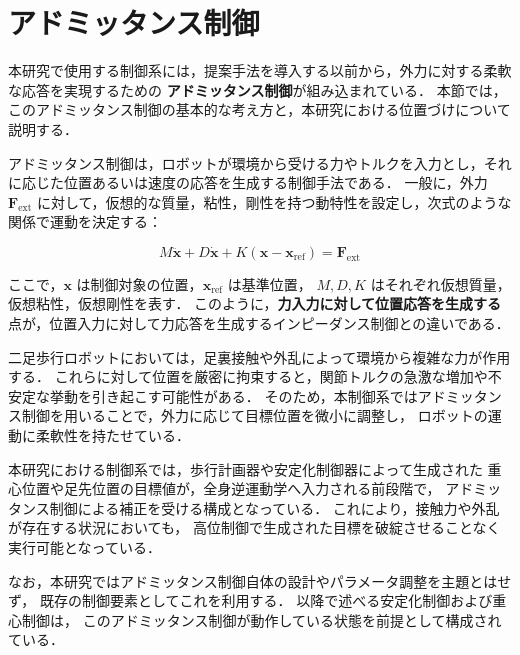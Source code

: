 \section{アドミッタンス制御}
\label{sec:admittance_control}

本研究で使用する制御系には，提案手法を導入する以前から，外力に対する柔軟な応答を実現するための
\textbf{アドミッタンス制御}が組み込まれている．
本節では，このアドミッタンス制御の基本的な考え方と，本研究における位置づけについて説明する．

アドミッタンス制御は，ロボットが環境から受ける力やトルクを入力とし，それに応じた位置あるいは速度の応答を生成する制御手法である．
一般に，外力 $\mathbf{F}_{\mathrm{ext}}$ に対して，仮想的な質量，粘性，剛性を持つ動特性を設定し，次式のような関係で運動を決定する：

\begin{equation}
M \ddot{\mathbf{x}} + D \dot{\mathbf{x}} + K (\mathbf{x} - \mathbf{x}_{\mathrm{ref}})
= \mathbf{F}_{\mathrm{ext}}
\end{equation}

ここで，$\mathbf{x}$ は制御対象の位置，$\mathbf{x}_{\mathrm{ref}}$ は基準位置，
$M, D, K$ はそれぞれ仮想質量，仮想粘性，仮想剛性を表す．
このように，\textbf{力入力に対して位置応答を生成する}点が，位置入力に対して力応答を生成するインピーダンス制御との違いである．

二足歩行ロボットにおいては，足裏接触や外乱によって環境から複雑な力が作用する．
これらに対して位置を厳密に拘束すると，関節トルクの急激な増加や不安定な挙動を引き起こす可能性がある．
そのため，本制御系ではアドミッタンス制御を用いることで，外力に応じて目標位置を微小に調整し，
ロボットの運動に柔軟性を持たせている．

本研究における制御系では，歩行計画器や安定化制御器によって生成された
重心位置や足先位置の目標値が，全身逆運動学へ入力される前段階で，
アドミッタンス制御による補正を受ける構成となっている．
これにより，接触力や外乱が存在する状況においても，
高位制御で生成された目標を破綻させることなく実行可能となっている．

なお，本研究ではアドミッタンス制御自体の設計やパラメータ調整を主題とはせず，
既存の制御要素としてこれを利用する．
以降で述べる安定化制御および重心制御は，
このアドミッタンス制御が動作している状態を前提として構成されている．